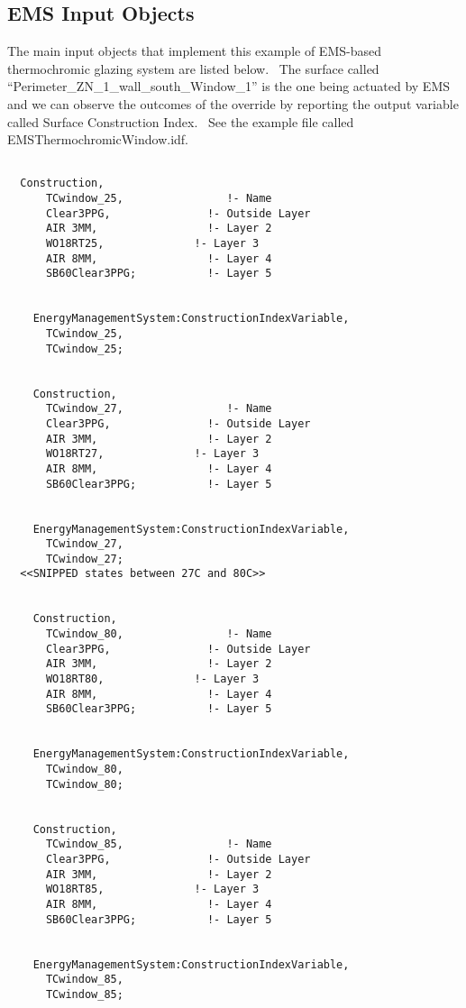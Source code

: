 \subsection{EMS Input Objects}\label{ems-input-objects-003}

The main input objects that implement this example of EMS-based thermochromic glazing system are listed below.~ The surface called ``Perimeter\_ZN\_1\_wall\_south\_Window\_1'' is the one being actuated by EMS and we can observe the outcomes of the override by reporting the output variable called Surface Construction Index.~ See the example file called EMSThermochromicWindow.idf.

\begin{lstlisting}

  Construction,
      TCwindow_25,                !- Name
      Clear3PPG,               !- Outside Layer
      AIR 3MM,                 !- Layer 2
      WO18RT25,              !- Layer 3
      AIR 8MM,                 !- Layer 4
      SB60Clear3PPG;           !- Layer 5


    EnergyManagementSystem:ConstructionIndexVariable,
      TCwindow_25,
      TCwindow_25;


    Construction,
      TCwindow_27,                !- Name
      Clear3PPG,               !- Outside Layer
      AIR 3MM,                 !- Layer 2
      WO18RT27,              !- Layer 3
      AIR 8MM,                 !- Layer 4
      SB60Clear3PPG;           !- Layer 5


    EnergyManagementSystem:ConstructionIndexVariable,
      TCwindow_27,
      TCwindow_27;
  <<SNIPPED states between 27C and 80C>>


    Construction,
      TCwindow_80,                !- Name
      Clear3PPG,               !- Outside Layer
      AIR 3MM,                 !- Layer 2
      WO18RT80,              !- Layer 3
      AIR 8MM,                 !- Layer 4
      SB60Clear3PPG;           !- Layer 5


    EnergyManagementSystem:ConstructionIndexVariable,
      TCwindow_80,
      TCwindow_80;


    Construction,
      TCwindow_85,                !- Name
      Clear3PPG,               !- Outside Layer
      AIR 3MM,                 !- Layer 2
      WO18RT85,              !- Layer 3
      AIR 8MM,                 !- Layer 4
      SB60Clear3PPG;           !- Layer 5


    EnergyManagementSystem:ConstructionIndexVariable,
      TCwindow_85,
      TCwindow_85;



\end{lstlisting}
